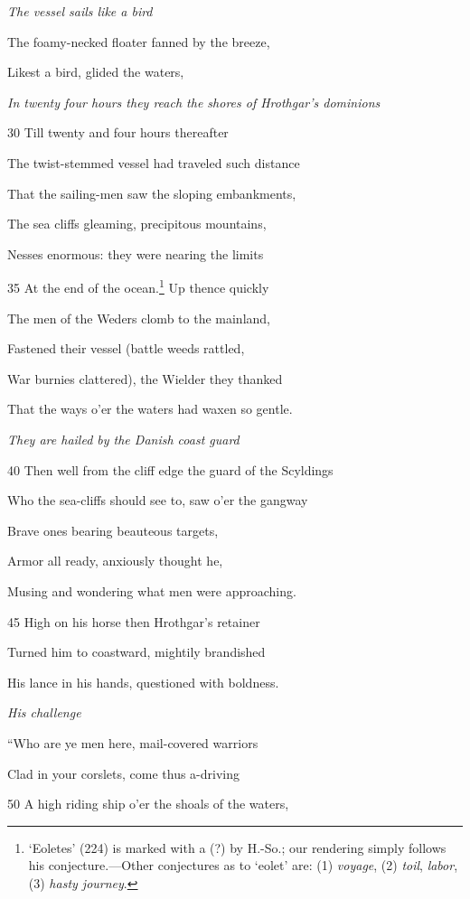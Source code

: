 \emph{The vessel sails
like a bird}

The foamy-necked floater fanned by the breeze,

Likest a bird, glided the waters,

\emph{In twenty four
hours they reach
the shores of
Hrothgar’s dominions}

30
Till twenty and four hours thereafter

The twist-stemmed vessel had traveled such distance

That the sailing-men saw the sloping embankments,

The sea cliffs gleaming, precipitous mountains,

Nesses enormous: they were nearing the limits

35
At the end of the ocean.\footnote{‘Eoletes’ (224) is marked with a (?) by H.-So.; our rendering simply
follows his conjecture.—Other conjectures as to ‘eolet’ are: (1) \emph{voyage},
(2) \emph{toil}, \emph{labor}, (3) \emph{hasty journey}.} Up thence quickly

The men of the Weders clomb to the mainland,

Fastened their vessel (battle weeds rattled,

War burnies clattered), the Wielder they thanked

That the ways o’er the waters had waxen so gentle.

\emph{They are hailed by
the Danish coast
guard}

40
Then well from the cliff edge the guard of the Scyldings

Who the sea-cliffs should see to, saw o’er the gangway

Brave ones bearing beauteous targets,

Armor all ready, anxiously thought he,

Musing and wondering what men were approaching.

45
High on his horse then Hrothgar’s retainer

Turned him to coastward, mightily brandished

His lance in his hands, questioned with boldness.

\emph{His challenge}

“Who are ye men here, mail-covered warriors

Clad in your corslets, come thus a-driving

50
A high riding ship o’er the shoals of the waters,

